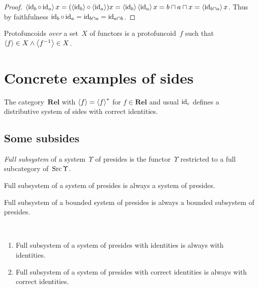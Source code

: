 \begin{proof}
$\left\langle \operatorname{id}_b\circ\operatorname{id}_a\right\rangle x = (\left\langle \operatorname{id}_b\right\rangle\circ\left\langle \operatorname{id}_a\right\rangle)x = \left\langle \operatorname{id}_b\right\rangle\left\langle \operatorname{id}_a\right\rangle x = b\sqcap a\sqcap x = \left\langle \operatorname{id}_{b\sqcap a}\right\rangle x$.
Thus by faithfulness $\operatorname{id}_b\circ\operatorname{id}_a = \operatorname{id}_{b\sqcap a} = \operatorname{id}_{a\sqcap b}$.
\end{proof}

\begin{defn}
Protofuncoids \emph{over} a set~$X$ of functors is a protofuncoid~$f$
such that $\left\langle f\right\rangle\in X\land\left\langle f^{-1}\right\rangle\in X$.
\end{defn}

\section{Concrete examples of sides}

\begin{obvious}
The category~$\mathbf{Rel}$ with $\left\langle f\right\rangle=\left\langle f\right\rangle ^{\ast}$ for $f\in\mathbf{Rel}$ and usual $\operatorname{id}_c$ defines a distributive system of sides with correct identities.
\end{obvious}

\subsection{Some subsides}

\begin{defn}
\emph{Full subsystem} of a system~$\Upsilon$ of presides is the functor~$\Upsilon$ restricted to a full subcategory of~$\operatorname{Src}\Upsilon$.
\end{defn}

\begin{obvious}
Full subsystem of a system of presides is always a system of presides.
\end{obvious}

\begin{obvious}
Full subsystem of a bounded system of presides is always a bounded subsystem of presides.
\end{obvious}

\begin{obvious}
~
\begin{enumerate}
\item Full subsystem of a system of presides with identities is always with identities.
\item Full subsystem of a system of presides with correct identities is always with correct identities.
\end{enumerate}
\end{obvious}

